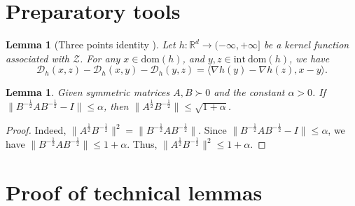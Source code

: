 \documentclass{article}
\theoremstyle{plain}
\newtheorem{lemma}[theorem]{Lemma}
\theoremstyle{definition}
\theoremstyle{remark}
\newcommand{\cD}{\mathcal{D}_{h}}
\newcommand{\dom}[1]{\mathrm{dom}(#1)}
\newcommand{\idom}[1]{\mathrm{int\ dom}(#1)}
\begin{document}
\section{Preparatory tools}
\begin{lemma}[Three points identity \cite{chen1993convergence}] 
\label{lem:three point}
Let $h: \mathbb{R}^d \to (-\infty,+\infty]$ be a kernel function associated with $\mathcal{Z}$. For any
$x \in \dom{h}$, and $y,z \in \idom{h}$, we have
\begin{equation*}
\cD(x,z) - \cD(x,y) - \cD(y,z) = \langle\nabla h(y) - \nabla h(z), x-y\rangle.    
\end{equation*}
\end{lemma}

\begin{lemma}\label{lem:matrix norm bound}
Given symmetric matrices $A,B \succ 0$ and the constant $\alpha>0$. If $\|B^{-\frac12}AB^{-\frac12}-I\| \leq \alpha$, then $\|A^{\frac12}B^{-\frac12}\|\leq \sqrt{1+\alpha}$.
\end{lemma}
\begin{proof}
    Indeed, $\|A^{\frac12}B^{-\frac12} \|^2 = \|B^{-\frac12} A B^{-\frac12}\|$. Since $\|B^{-\frac12}AB^{-\frac12}-I\| \leq \alpha$, we have $\|B^{-\frac12}AB^{-\frac12}\|\leq 1+\alpha$. Thus, $\big\|A^{\frac12}B^{-\frac12} \big\|^2 \leq 1+\alpha$.
\end{proof}

 


\section{Proof of technical lemmas}
\end{document}
